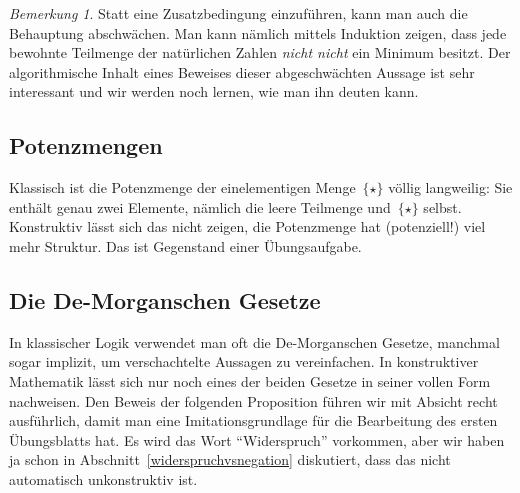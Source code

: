 \documentclass[a4paper,ngerman,12pt]{scrartcl}
\theoremstyle{definition}
\theoremstyle{plain}
\theoremstyle{remark}
\newtheorem{bem}[defn]{Bemerkung}
\renewcommand{\_}{\mathpunct{.}\,}
\newcommand{\?}{\,{:}\,}
\begin{document}
\begin{bem}Statt eine Zusatzbedingung einzuführen, kann man auch die Behauptung
abschwächen. Man kann nämlich mittels Induktion zeigen, dass jede
bewohnte Teilmenge der natürlichen Zahlen \emph{nicht nicht} ein Minimum
besitzt. Der algorithmische Inhalt eines Beweises dieser abgeschwächten Aussage
ist sehr interessant und wir werden noch lernen, wie man ihn deuten kann.\end{bem}


\subsection{Potenzmengen}

Klassisch ist die Potenzmenge der einelementigen Menge~$\{\star\}$ völlig
langweilig: Sie enthält genau zwei Elemente, nämlich die leere Teilmenge
und~$\{\star\}$ selbst. Konstruktiv lässt sich das nicht zeigen, die
Potenzmenge hat (potenziell!) viel mehr Struktur. Das ist Gegenstand einer
Übungsaufgabe.


\subsection{Die De-Morganschen Gesetze}

In klassischer Logik verwendet man oft die De-Morganschen Gesetze, manchmal
sogar implizit, um verschachtelte Aussagen zu vereinfachen. In konstruktiver
Mathematik lässt sich nur noch eines der beiden Gesetze in seiner vollen Form
nachweisen. Den Beweis der folgenden Proposition führen wir mit Absicht recht
ausführlich, damit man eine Imitationsgrundlage für die Bearbeitung des ersten
Übungsblatts hat. Es wird das Wort "`Widerspruch"' vorkommen, aber wir haben ja
schon in Abschnitt~\ref{widerspruchvsnegation} diskutiert, dass das nicht
automatisch unkonstruktiv ist.
\end{document}
